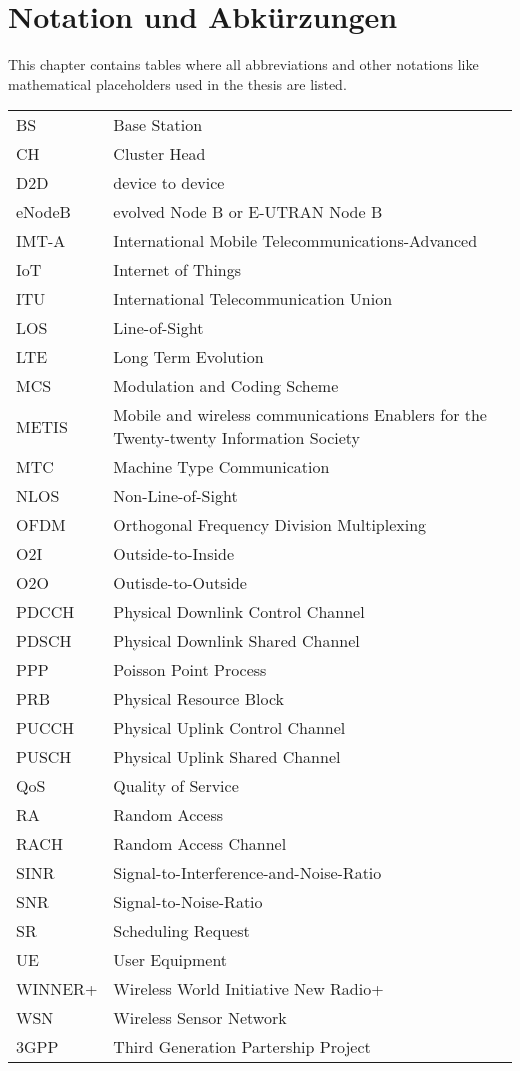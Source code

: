 \chapter{Notation und Abkürzungen}
This chapter contains tables where all abbreviations and other notations like mathematical
placeholders used in the thesis are listed.
\begin{table}[h]
\begin{tabular}{ll}
BS & Base Station\\
CH & Cluster Head\\
D2D & device to device\\
eNodeB & evolved Node B or E-UTRAN Node B\\
IMT-A & International Mobile Telecommunications-Advanced\\
IoT & Internet of Things\\
ITU & International Telecommunication Union\\
LOS & Line-of-Sight\\
LTE & Long Term Evolution\\
MCS & Modulation and Coding Scheme\\
METIS & Mobile and wireless communications Enablers for the Twenty-twenty Information Society \\
MTC & Machine Type Communication\\
NLOS & Non-Line-of-Sight\\
OFDM & Orthogonal Frequency Division Multiplexing\\
O2I & Outside-to-Inside\\
O2O & Outisde-to-Outside\\
PDCCH & Physical Downlink Control Channel\\
PDSCH & Physical Downlink Shared Channel\\
PPP & Poisson Point Process\\
PRB & Physical Resource Block\\
PUCCH & Physical Uplink Control Channel\\
PUSCH & Physical Uplink Shared Channel\\
QoS & Quality of Service\\
RA & Random Access\\
RACH & Random Access Channel\\
SINR & Signal-to-Interference-and-Noise-Ratio\\
SNR & Signal-to-Noise-Ratio\\ 
SR & Scheduling Request\\
UE & User Equipment\\
WINNER+ & Wireless World Initiative New Radio+ \\
WSN & Wireless Sensor Network\\
3GPP & Third Generation Partership Project\\
\end{tabular}
\end{table}

